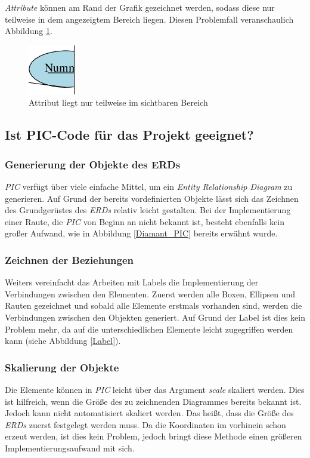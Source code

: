 \noindent
\textit{Attribute} können am Rand der Grafik gezeichnet werden, sodass diese nur teilweise in dem angezeigtem Bereich liegen. Diesen Problemfall veranschaulich Abbildung \ref{Attr_abgeschnitten}.
\\

\begin{figure}[H]
	\begin{center}
		\includegraphics{images/Attr_abgeschnitten.png}
		\caption{Attribut liegt nur teilweise im sichtbaren Bereich}
		\label{Attr_abgeschnitten}
	\end{center}
\end{figure}


\subsection{Ist PIC-Code für das Projekt geeignet?}
\pra
\subsubsection{Generierung der Objekte des ERDs}
\textit{PIC} verfügt über viele einfache Mittel, um ein \textit{Entity Relationship Diagram} zu generieren. Auf Grund der bereits vordefinierten Objekte lässt sich das Zeichnen des Grundgerüstes des \textit{ERDs} relativ leicht gestalten. Bei der Implementierung einer Raute, die \textit{PIC} von Beginn an nicht bekannt ist, besteht ebenfalls kein großer Aufwand, wie in Abbildung \ref{Diamant_PIC} bereits erwähnt wurde.


\subsubsection{Zeichnen der Beziehungen}
\noindent
Weiters vereinfacht das Arbeiten mit Labels die Implementierung der Verbindungen zwischen den Elementen. Zuerst werden alle Boxen, Ellipsen und Rauten gezeichnet und sobald alle Elemente erstmals vorhanden sind, werden die Verbindungen zwischen den Objekten generiert. Auf Grund der Label ist dies kein Problem mehr, da auf die unterschiedlichen Elemente leicht zugegriffen werden kann (siehe Abbildung \ref{Label}).


\subsubsection{Skalierung der Objekte}
\noindent
Die Elemente können in \textit{PIC} leicht über das Argument \textit{scale} skaliert werden. Dies ist hilfreich, wenn die Größe des zu zeichnenden Diagrammes bereits bekannt ist. Jedoch kann nicht automatisiert skaliert werden. Das heißt, dass die Größe des \textit{ERDs} zuerst festgelegt werden muss. Da die Koordinaten im vorhinein schon erzeut werden, ist dies kein Problem, jedoch bringt diese Methode einen größeren Implementierungsaufwand mit sich.

